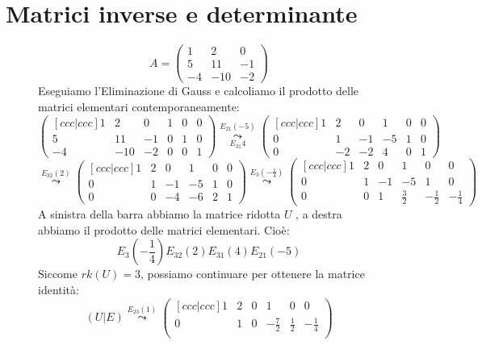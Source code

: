 \documentclass[a4paper]{article}
\theoremstyle{break}
\theoremstyle{break}
\theoremstyle{break}
\theoremstyle{break}
\begin{document}
\section{Matrici inverse e determinante}
\begin{figure}[H]
  \begin{example}
    \[
      A = \begin{pmatrix} 
        1 & 2 & 0\\
        5 & 11 & -1\\
        -4 & -10 & -2
      \end{pmatrix} 
    \] 
    Eseguiamo l'Eliminazione di Gauss e calcoliamo il prodotto delle matrici elementari
    contemporaneamente:
    \[
      \begin{pmatrix}[ccc|ccc] 
        1 & 2 & 0 & 1 & 0 & 0\\
      5 & 11 & -1 & 0 & 1 & 0\\
      -4 & -10 & -2 & 0 & 0 & 1
    \end{pmatrix} 
    \stackrel{E_{21}(-5)}{\underset{E_{31}4}{\leadsto}}
    \begin{pmatrix}[ccc|ccc] 
      1 & 2 & 0 & 1 & 0 & 0\\
      0 & 1 & -1 & -5 & 1 & 0\\
      0 & -2 & -2 & 4 & 0 & 1
    \end{pmatrix}
   \]
   \[
     \stackrel{E_{32}(2)}{\leadsto}
     \begin{pmatrix}[ccc|ccc]
       1 & 2 & 0 & 1 & 0 & 0\\
       0 & 1 & -1 & -5 & 1 & 0\\
       0 & 0 & -4 & -6 & 2 & 1
     \end{pmatrix}
     \stackrel{E_3(-\frac{1}{4})}{\leadsto}
     \begin{pmatrix}[ccc|ccc]
       1 & 2 & 0 & 1 & 0 & 0\\
       0 & 1 & -1 & -5 & 1 & 0\\
       0 & 0 & 1 & \frac{3}{2} & -\frac{1}{2} & -\frac{1}{4}
      \end{pmatrix}
   \] 
   A sinistra della barra abbiamo la matrice ridotta \( U \) , a destra abbiamo il prodotto delle
   matrici elementari. Cioè: 
   \[
     E_3(-\frac{1}{4})E_{32}(2)E_{31}(4)E_{21}(-5)
   \] 
   Siccome \( rk(U) = 3 \), possiamo continuare per ottenere la matrice identità:
   \[
     (U|E) \stackrel{E_{23}(1)}{\leadsto} \begin{pmatrix}[ccc|ccc]
       1 & 2 & 0 & 1 & 0 & 0\\
       0 & 1 & 0 & -\frac{7}{2} & \frac{1}{2} & -\frac{1}{4}\\

\end{pmatrix}\]
\end{example}
\end{figure}
\end{document}
